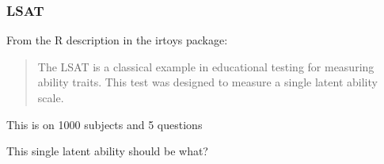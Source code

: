 \documentclass[dvipsnames]{beamer}\usepackage[]{graphicx}\usepackage[]{color}
\begin{document}
\begin{frame}
\frametitle{LSAT}
From the R description in the irtoys package:

\vspace{1cm}
\begin{quote}
The LSAT is a classical example in educational testing for measuring ability traits. This test was designed to measure a single latent ability scale.
\end{quote}

\vspace{1cm}
This is on 1000 subjects and 5 questions

\vspace{1cm}
\textcolor{wared}{This single latent ability should be what?}

\end{frame}
\end{document}
